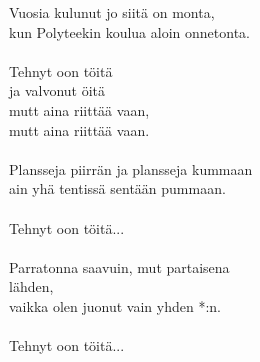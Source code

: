 
Vuosia kulunut jo siitä on monta, \\ kun Polyteekin koulua aloin onnetonta. \\ \hspace{10mm} \\ Tehnyt oon töitä \\ ja valvonut öitä \\ mutt aina riittää vaan, \\ mutt aina riittää vaan. \\ \hspace{10mm} \\ Plansseja piirrän ja plansseja kummaan \\ ain yhä tentissä sentään pummaan. \\ \hspace{10mm} \\ Tehnyt oon töitä... \\ \hspace{10mm} \\ Parratonna saavuin, mut partaisena \\ lähden, \\ vaikka olen juonut vain yhden *:n. \\ \hspace{10mm} \\ Tehnyt oon töitä...